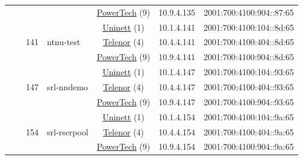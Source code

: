 \begin{small}
\begin{center}
\begin{longtable}{|c|c|c|c|c|c|c|c|}
  &  &  &  & \multicolumn{2}{|c|}{\tiny{\href{http://www.powertech.no}{PowerTech} (9)}} & \tiny{10.9.4.135} & \tiny{2001:700:4100:904::87:65} \\* \cline{3-3}\cline{4-4}\cline{5-5}\cline{6-6}\cline{7-7}\cline{8-8}
  &  & \multirow{3}{*}{\tiny{141}} & \multicolumn{1}{|l|}{\multirow{3}{*}{\tiny{ntnu-test}}} & \multicolumn{2}{|c|}{\tiny{\href{https://www.uninett.no}{Uninett} (1)}} & \tiny{10.1.4.141} & \tiny{2001:700:4100:104::8d:65} \\* \cline{5-5}\cline{6-6}\cline{7-7}\cline{8-8}
  &  &  &  & \multicolumn{2}{|c|}{\tiny{\href{https://www.telenor.no}{Telenor} (4)}} & \tiny{10.4.4.141} & \tiny{2001:700:4100:404::8d:65} \\* \cline{5-5}\cline{6-6}\cline{7-7}\cline{8-8}
  &  &  &  & \multicolumn{2}{|c|}{\tiny{\href{http://www.powertech.no}{PowerTech} (9)}} & \tiny{10.9.4.141} & \tiny{2001:700:4100:904::8d:65} \\* \cline{3-3}\cline{4-4}\cline{5-5}\cline{6-6}\cline{7-7}\cline{8-8}
  &  & \multirow{3}{*}{\tiny{147}} & \multicolumn{1}{|l|}{\multirow{3}{*}{\tiny{srl-nndemo}}} & \multicolumn{2}{|c|}{\tiny{\href{https://www.uninett.no}{Uninett} (1)}} & \tiny{10.1.4.147} & \tiny{2001:700:4100:104::93:65} \\* \cline{5-5}\cline{6-6}\cline{7-7}\cline{8-8}
  &  &  &  & \multicolumn{2}{|c|}{\tiny{\href{https://www.telenor.no}{Telenor} (4)}} & \tiny{10.4.4.147} & \tiny{2001:700:4100:404::93:65} \\* \cline{5-5}\cline{6-6}\cline{7-7}\cline{8-8}
  &  &  &  & \multicolumn{2}{|c|}{\tiny{\href{http://www.powertech.no}{PowerTech} (9)}} & \tiny{10.9.4.147} & \tiny{2001:700:4100:904::93:65} \\* \cline{3-3}\cline{4-4}\cline{5-5}\cline{6-6}\cline{7-7}\cline{8-8}
  &  & \multirow{3}{*}{\tiny{154}} & \multicolumn{1}{|l|}{\multirow{3}{*}{\tiny{srl-rserpool}}} & \multicolumn{2}{|c|}{\tiny{\href{https://www.uninett.no}{Uninett} (1)}} & \tiny{10.1.4.154} & \tiny{2001:700:4100:104::9a:65} \\* \cline{5-5}\cline{6-6}\cline{7-7}\cline{8-8}
  &  &  &  & \multicolumn{2}{|c|}{\tiny{\href{https://www.telenor.no}{Telenor} (4)}} & \tiny{10.4.4.154} & \tiny{2001:700:4100:404::9a:65} \\* \cline{5-5}\cline{6-6}\cline{7-7}\cline{8-8}
  &  &  &  & \multicolumn{2}{|c|}{\tiny{\href{http://www.powertech.no}{PowerTech} (9)}} & \tiny{10.9.4.154} & \tiny{2001:700:4100:904::9a:65} \\* \cline{3-3}\cline{4-4}\cline{5-5}\cline{6-6}\cline{7-7}\cline{8-8}

\end{longtable}
\end{center}
\end{small}

